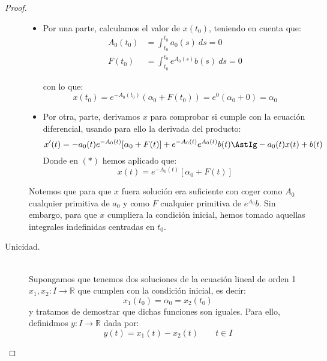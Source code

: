 \begin{prop}
\begin{proof}
\begin{description}
                \begin{itemize}
                    \item Por una parte, calculamos el valor de $x(t_0)$, teniendo en cuenta que:
                        \begin{align*}
                            A_0(t_0) &= \int_{t_0}^{t_0} a_0(s)~ds  = 0 \\
                            F(t_0) &= \int_{t_0}^{t_0} e^{A_0(s)}b(s)~ds = 0
                        \end{align*}

                        con lo que:
                        \begin{equation*}
                            x(t_0) = e^{-A_0(t_0)}(\alpha_0 + F(t_0)) = e^0 (\alpha_0 + 0) = \alpha_0
                        \end{equation*}
                    \item Por otra, parte, derivamos $x$ para comprobar si cumple con la ecuación diferencial, usando para ello la derivada del producto:
                        \begin{equation*}
                            x'(t) = -a_0(t)e^{-A_0(t)} [\alpha_0 + F(t)] + e^{-A_0(t)}e^{A_0(t)}b(t) \AstIg -a_0(t) x(t) + b(t)
                        \end{equation*}
                        Donde en $(\ast)$ hemos aplicado que:
                        \begin{equation*}
                            x(t) = e^{-A_0(t)} [\alpha_0 + F(t)]
                        \end{equation*}
                \end{itemize}
                Notemos que para que $x$ fuera solución era suficiente con coger como $A_0$ cualquier primitiva de $a_0$ y como $F$ cualquier primitiva de $e^{A_0}b$. Sin embargo, para que $x$ cumpliera la condición inicial, hemos tomado aquellas integrales indefinidas centradas en $t_0$.

            \item [Unicidad.]~\\
                Supongamos que tenemos dos soluciones de la ecuación lineal de orden 1 $x_1,x_2:I\rightarrow\mathbb{R}$ que cumplen con la condición inicial, es decir:
                \begin{equation*}
                    x_1(t_0) = \alpha_0 = x_2(t_0)
                \end{equation*}
                y tratamos de demostrar que dichas funciones son iguales. Para ello, definidmos $y:I\rightarrow\mathbb{R}$ dada por:
                \begin{equation*}
                    y(t) = x_1(t) - x_2(t) \qquad t\in I
                \end{equation*}


\end{description}
\end{proof}
\end{prop}
